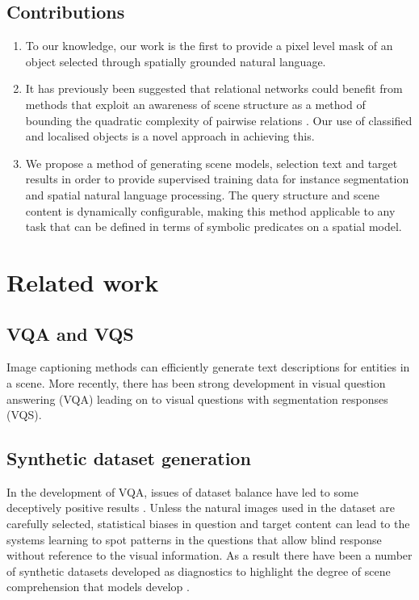 \documentclass[conference]{IEEEtran}
\begin{document}
 
    \subsection{Contributions}

\begin{enumerate}
  \item To our knowledge, our work is the first to provide a pixel level mask of an object selected through  spatially grounded natural language. 

  \item It has previously been suggested that relational networks could benefit from methods that exploit an awareness of scene structure as a method of bounding the quadratic complexity of pairwise relations \cite{RN1}.  Our use of classified and localised objects is a novel approach in achieving this.  

  \item We propose a method of generating scene models, selection text and target results in order to provide supervised training data for instance segmentation and spatial natural language processing.  The query structure and scene content is dynamically configurable, making this method applicable to any task that can be defined in terms of symbolic predicates on a spatial model. 
\end{enumerate}

    \section{Related work}  

    \subsection{VQA and VQS}

Image captioning methods can efficiently generate text descriptions for entities in a scene\cite{RN96, RN60}.  More recently, there has been strong development in  visual question answering (VQA)\cite{RN67} leading on to visual questions with segmentation responses (VQS)\cite{RN80, RN78}.

    \subsection{Synthetic dataset generation}

In the development of VQA, issues of dataset balance have led to some deceptively positive results \cite{RN95}.  Unless the natural images used in the dataset are carefully selected, statistical biases in question and target content can lead to the systems learning to spot patterns in the questions that allow blind response without reference to the visual information\cite{RN68}.  As a result there have been a number of synthetic datasets developed as diagnostics to highlight the degree of scene comprehension that models develop \cite{RN68, RN1}. 
\end{document}
